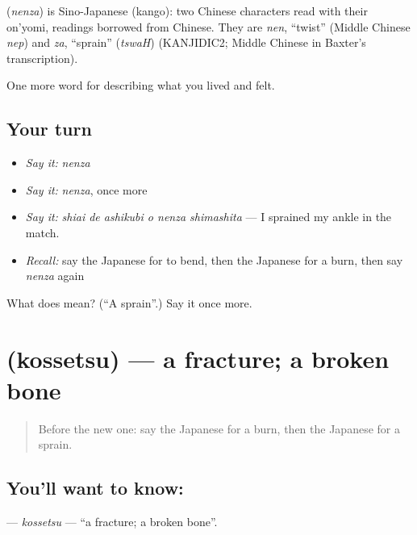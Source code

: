 \begin{cousinweb}
\textbf{} (\emph{nenza}) is Sino-Japanese (kango): two Chinese characters read with their on'yomi, readings borrowed from Chinese. They are \emph{nen}, \textquotedblleft{}twist\textquotedblright{} (Middle Chinese \emph{nep}) and \emph{za}, \textquotedblleft{}sprain\textquotedblright{} (\emph{tswaH}) (KANJIDIC2; Middle Chinese in Baxter's transcription).
\end{cousinweb}

\begin{grammarlens}[title={What you've built}]
One more word for describing what you lived and felt.
\end{grammarlens}

\subsection*{Your turn}
\begin{itemize}
\raggedright
  \item \emph{Say it:} \emph{nenza}
  \item \emph{Say it:} \emph{nenza}, once more
  \item \emph{Say it:} \emph{shiai de ashikubi o nenza shimashita} — I sprained my ankle in the match.
  \item \emph{Recall:} say the Japanese for to bend, then the Japanese for a burn, then say \emph{nenza} again
\end{itemize}

\begin{tcolorbox}[breakable,colback=teal!4,colframe=teal!35!black,title={Before you move on}]
What does  mean? (\textquotedblleft{}A sprain\textquotedblright{}.) Say it once more.
\end{tcolorbox}
\section[\texorpdfstring{\ja{こっせつ} (kossetsu)}{こっせつ (kossetsu)}]{ (kossetsu) — a fracture; a broken bone}

\label{lesson:JA-C449-kossetsu}



\begin{quote}
Before the new one: say the Japanese for a burn, then the Japanese for a sprain.
\end{quote}

\subsection*{You'll want to know: }
\textbf{} — \emph{kossetsu} — \textquotedblleft{}a fracture; a broken bone\textquotedblright{}.

